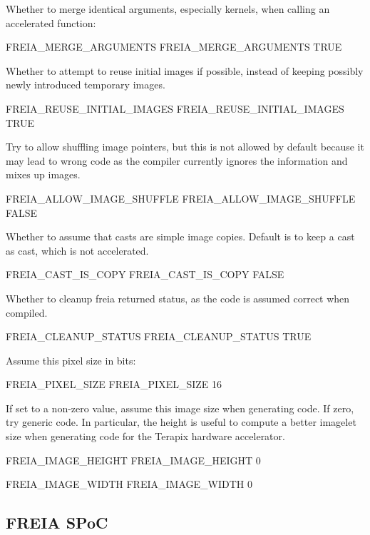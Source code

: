 \documentclass[a4paper]{report}
\begin{document}
Whether to merge identical arguments, especially kernels, when calling
an accelerated function:
\begin{PipsProp}{FREIA_MERGE_ARGUMENTS}
FREIA_MERGE_ARGUMENTS TRUE
\end{PipsProp}

Whether to attempt to reuse initial images if possible, instead
of keeping possibly newly introduced temporary images.
\begin{PipsProp}{FREIA_REUSE_INITIAL_IMAGES}
FREIA_REUSE_INITIAL_IMAGES TRUE
\end{PipsProp}

Try to allow shuffling image pointers, but this is not allowed by
default because it may lead to wrong code as the compiler currently
ignores the information and mixes up images.
\begin{PipsProp}{FREIA_ALLOW_IMAGE_SHUFFLE}
FREIA_ALLOW_IMAGE_SHUFFLE FALSE
\end{PipsProp}

Whether to assume that casts are simple image copies.
Default is to keep a cast as cast, which is not accelerated.
\begin{PipsProp}{FREIA_CAST_IS_COPY}
FREIA_CAST_IS_COPY FALSE
\end{PipsProp}

Whether to cleanup freia returned status, as the code is assumed correct
when compiled.
\begin{PipsProp}{FREIA_CLEANUP_STATUS}
FREIA_CLEANUP_STATUS TRUE
\end{PipsProp}

Assume this pixel size in bits:
\begin{PipsProp}{FREIA_PIXEL_SIZE}
FREIA_PIXEL_SIZE 16
\end{PipsProp}

If set to a non-zero value, assume this image size when generating code.
If zero, try generic code.
In particular, the height is useful to compute a better imagelet size
when generating code for the Terapix hardware accelerator.
\begin{PipsProp}{FREIA_IMAGE_HEIGHT}
FREIA_IMAGE_HEIGHT 0
\end{PipsProp}
\begin{PipsProp}{FREIA_IMAGE_WIDTH}
FREIA_IMAGE_WIDTH 0
\end{PipsProp}

\subsection{FREIA SPoC}
\label{hwac-freia-spoc}
\end{document}
